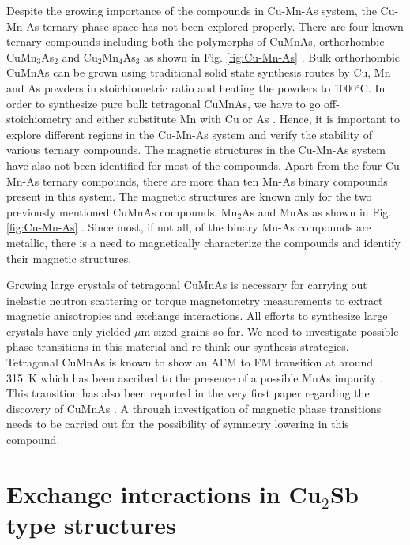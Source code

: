\documentclass[10pt,doublespacing,edeposit]{uiucthesis2020}
\begin{document}
\begin{mainmatter}
Despite the growing importance of the compounds in Cu-Mn-As system, the Cu-Mn-As ternary phase space has not been explored properly. There are four known ternary compounds including both the polymorphs of CuMnAs, orthorhombic CuMn$_3$As$_2$ and Cu$_2$Mn$_4$As$_3$ as shown in Fig. \ref{fig:Cu-Mn-As} \cite{Nateprov2011,MacA2012,Wadley2013,Uhlirova2015}. Bulk orthorhombic CuMnAs can be grown using traditional solid state synthesis routes by Cu, Mn and As powders in stoichiometric ratio and heating the powders to 1000$^\circ$C. In order to synthesize pure bulk tetragonal CuMnAs, we have to go off-stoichiometry and either substitute Mn with Cu or As \cite{Uhlirova2015}. Hence, it is important to explore different regions in the Cu-Mn-As system and verify the stability of various ternary compounds. The magnetic structures in the Cu-Mn-As system have also not been identified for most of the compounds. Apart from the four Cu-Mn-As ternary compounds, there are more than ten Mn-As binary compounds present in this system. The magnetic structures are known only for the two previously mentioned CuMnAs compounds, Mn$_2$As and MnAs as shown in Fig. \ref{fig:Cu-Mn-As} \cite{MacA2012,Wadley2013,Hills2015,Wadley2015,Austin1962,Bacon1955}. Since most, if not all, of the binary Mn-As compounds are metallic, there is a need to magnetically characterize the compounds and identify their magnetic structures.

Growing large crystals of tetragonal CuMnAs is necessary for carrying out inelastic neutron scattering or torque magnetometry measurements to extract magnetic anisotropies and exchange interactions. All efforts to synthesize large crystals have only yielded $\mu$m-sized grains so far\cite{Uhlirova2019,Volny2020}. We need to investigate possible phase transitions in this material and re-think our synthesis strategies. Tetragonal CuMnAs is known to show an AFM to FM transition at around 315~K which has been ascribed to the presence of a possible MnAs impurity \cite{Uhlirova2019}. This transition has also been reported in the very first paper regarding the discovery of CuMnAs \cite{Nateprov2011}. A through investigation of magnetic phase transitions needs to be carried out for the possibility of symmetry lowering in this compound.

\section{Exchange interactions in Cu$_2$Sb type structures}


\end{mainmatter}
\end{document}
